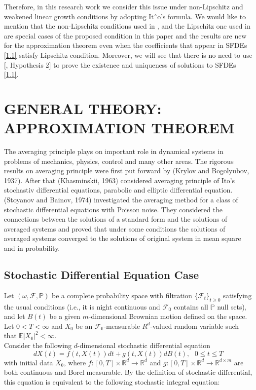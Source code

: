 \documentclass[a4 paper, 12pt]{report}
\theoremstyle{plain}
\begin{document}
\par  Therefore, in this research work we consider this issue under non-Lipschitz
and weakened linear growth conditions by adopting Itˆo’s formula. We would like
to mention that the non-Lipschitz conditions used in \cite{1},\cite{17} and the Lipschitz one
used in \cite{12} are special cases of the proposed condition in this paper and the results
are new for the approximation theorem even when the coefficients that appear in
SFDEs \eqref{1.1} satisfy Lipschitz condition. Moreover, we will see that there is no need
to use [\cite{25}, Hypothesis 2] to prove the existence and uniqueness of solutions to
SFDEs \eqref{1.1}.


\chapter{GENERAL THEORY: APPROXIMATION THEOREM}
\noindent
\par The averaging principle  plays on important role in dynamical systems in problems of mechanics, physics, control and many other areas. The rigorous results on averaging principle were first put forward by (Krylov and Bogolyubov, 1937). After that (Khasminskii, 1963) considered averaging principle of Ito's stochastiv differential equations, parabolic and elliptic differential equation. (Stoyanov and Bainov, 1974) investigated the averaging method for a class of stochastic differential equations with Poisson noise. They considered the connections between the solutions of a standard form and the solutions of averaged systems and proved that under some conditions the solutions of averaged systems converged to the solutions of original system in mean square and in probability.
\section{Stochastic Differential Equation Case}
Let $(\omega,\mathcal{F},\mathbb{P})$ be a complete probability space with filtration $\{\mathcal{F}_t\}_{t\geq 0}$ satisfying the usual conditions (i.e., it is night continuous and $\mathcal{F}_0$ contains all $\mathbb{P}$ null sets), and let $B(t)$ be a given $m$-dimensional Brownian motion defined on the space. Let $0<T<\infty$ and $X_0$ be an $\mathcal{F}_0$-measurable $R^d$-valued random variable such that $\mathbb{E}|X_0|^2<\infty$.\\
Consider the following $d$-dimensional stochastic differential equation
\begin{equation}\label{3.1.1}
dX(t) = f(t,X(t))dt+g(t,X(t))dB(t),~~~0\leq t\leq T
\end{equation}
with initial data $X_0$, where $f:[0,T]\times\mathbb{R}^d\rightarrow\mathbb{R}^d$ and $g:[0,T]\times\mathbb{R}^d\rightarrow\mathbb{R}^{d\times m}$ are both continuous  and Borel measurable. By the definition of stochastic differential, this equation is equivalent to the following stochastic integral equation:
\end{document}
